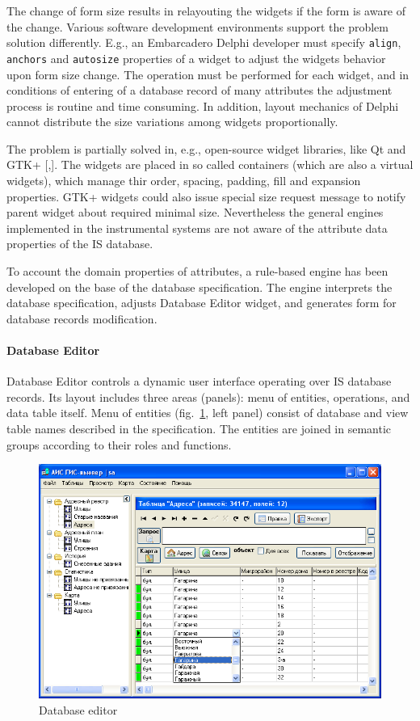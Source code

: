 \documentclass[conference]{IEEEtran}
\begin{document}
The change of form size results in relayouting the widgets if the form is aware of the change.  Various software development environments support the problem solution differently.  E.g., an Embarcadero Delphi developer must specify \texttt{align}, \texttt{anchors} and \texttt{autosize} properties of a widget to adjust the widgets behavior upon form size change.  The operation must be performed for each widget, and in conditions of entering of a database record of many attributes the adjustment process is routine and time consuming.  In addition, layout mechanics of Delphi cannot distribute the size variations among widgets proportionally.

The problem is partially solved in, e.g., open-source widget libraries, like Qt and GTK+ [,].  The widgets are placed in so called containers (which are also a virtual widgets), which manage thir order, spacing, padding, fill and expansion properties.  GTK+ widgets could also issue special size request message to notify parent widget about required minimal size.  Nevertheless the general engines implemented in the instrumental systems are not aware of the attribute data properties of the IS database.

To account the domain properties of attributes, a rule-based engine has been developed on the base of the database specification.  The engine interprets the database specification, adjusts Database Editor widget, and generates form for database records modification.

\paragraph{Database Editor}

Database Editor controls a dynamic user interface operating over IS database records.  Its layout includes three areas (panels): menu of entities, operations, and data table itself.  Menu of entities (fig.~\ref{fig:dbeditor}, left panel) consist of database and view table names described in the specification.  The entities are joined in semantic groups according to their roles and functions.

\begin{figure}[tb]
  \centering
  \includegraphics[width=\linewidth]{dbeditor.png}
  \caption{Database editor}
  \label{fig:dbeditor}
\end{figure}
\end{document}
